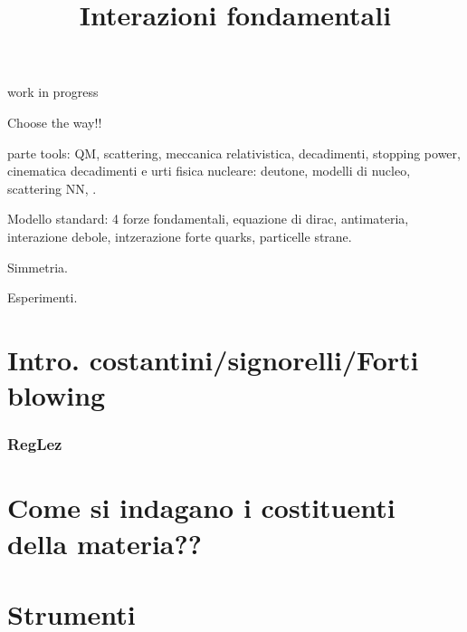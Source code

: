 \documentclass[10pt,xcolor={usenames},fleqn,mathserif,serif]{beamer}
\title{Interazioni fondamentali}
\begin{document}

\begin{frame}{work in progress}

Choose the way!!

    parte tools: QM, scattering, meccanica relativistica, decadimenti, stopping power, cinematica decadimenti e urti
    fisica nucleare: deutone, modelli di nucleo, scattering NN, .
    
    Modello standard: 4 forze fondamentali,  equazione di dirac, antimateria, interazione debole, intzerazione forte quarks, particelle strane.
    
    Simmetria.
    
    Esperimenti.
    
\end{frame}

\begin{frame}
  \titlepage
  \tableofcontents[onlyparts]

\end{frame}


\part{Intro. costantini/signorelli/Forti blowing}\label{part:lezioni}
\frame{\partpage}
\section{RegLez}


\part{Come si indagano i costituenti della materia??}\label{mainaims}
\frame{\partpage}


\part{Strumenti}\label{tools}
\frame{\partpage}

\end{document}
